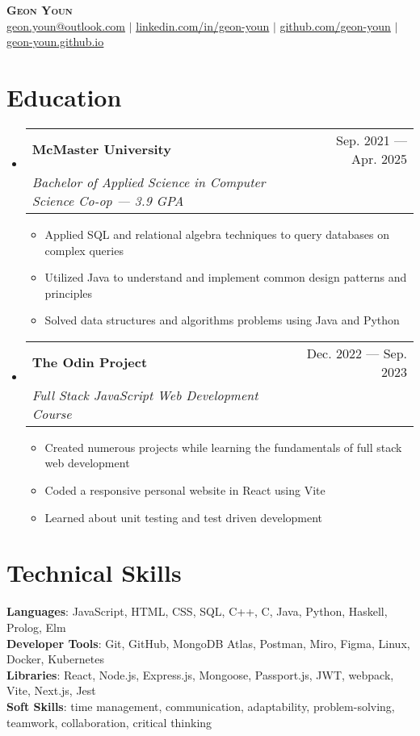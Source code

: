 \documentclass[letterpaper,11pt]{article}
\makeatletter
\newcommand{\resumeItem}[1]{
	\item\small{
		{#1 \vspace{-2pt}}
	}
}
\newcommand{\resumeSubheading}[4]{
	\vspace{-2pt}\item
	\begin{tabular*}{0.97\textwidth}[t]{l@{\extracolsep{\fill}}r}
		\textbf{#1} & #2 \\
		\textit{\small#3} & \textit{\small #4} \\
	\end{tabular*}\vspace{-7pt}
}
\newcommand{\resumeSubHeadingListStart}{\begin{itemize}[leftmargin=0.15in,
			label={}]}
\newcommand{\resumeSubHeadingListEnd}{\end{itemize}}
\newcommand{\resumeItemListStart}{\begin{itemize}}
\newcommand{\resumeItemListEnd}{\end{itemize}\vspace{-5pt}}
\makeatother
\begin{document}
\begin{center}
	\textbf{\Huge \scshape Geon Youn} \\ \vspace{1pt}
	\small
	\href{mailto:geon.youn@outlook.com}{\underline{geon.youn@outlook.com}}
	$|$
	\href{https://linkedin.com/in/geon-youn}{\underline{linkedin.com/in/geon-youn}}
	$|$
	\href{https://github.com/geon-youn}{\underline{github.com/geon-youn}}
  $|$
  \href{https://geon-youn.github.io/}{\underline{geon-youn.github.io}}
\end{center}

\section{Education}
\resumeSubHeadingListStart
\resumeSubheading
{McMaster University}{Sep. 2021 --- Apr. 2025}
{Bachelor of Applied Science in Computer Science Co-op --- 3.9 GPA}{}
\resumeItemListStart
\resumeItem{Applied SQL and relational algebra techniques to query databases on complex queries}
\resumeItem{Utilized Java to understand and implement common design patterns and principles}
\resumeItem{Solved data structures and algorithms problems using Java and Python}
\resumeItemListEnd
\resumeSubheading
{The Odin Project}{Dec. 2022 --- Sep. 2023}
{Full Stack JavaScript Web Development Course}{}
\resumeItemListStart
\resumeItem{Created numerous projects while learning the fundamentals of full stack web development}
\resumeItem{Coded a responsive personal website in React using Vite}
\resumeItem{Learned about unit testing and test driven development}
\resumeItemListEnd
\resumeSubHeadingListEnd

\section{Technical Skills}
\begin{itemize}[leftmargin=0.15in, label={}]
	\small{\item{
		            \textbf{Languages}{: JavaScript, HTML, CSS, SQL, C++, C, Java, Python, Haskell,
			            Prolog, Elm} \\
		            \textbf{Developer Tools}{: Git, GitHub, MongoDB Atlas, Postman, Miro, Figma, Linux, Docker, Kubernetes} \\
		            \textbf{Libraries}{: React, Node.js, Express.js, Mongoose, Passport.js, JWT, webpack, Vite, Next.js, Jest} \\
		            \textbf{Soft Skills}{: time management,
			            communication, adaptability,
			            problem-solving, teamwork, collaboration, critical thinking}
		      }}
\end{itemize}
\end{document}
